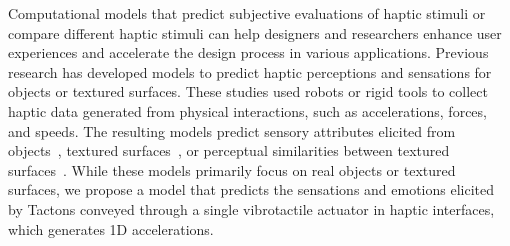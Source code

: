 Computational models that predict subjective evaluations of haptic stimuli or compare different haptic stimuli can help designers and researchers enhance user experiences and accelerate the design process in various applications. 
Previous research has developed models to predict haptic perceptions and sensations for objects or textured surfaces.
These studies used robots or rigid tools to collect haptic data generated from physical interactions, such as accelerations, forces, and speeds.
The resulting models predict sensory attributes elicited from objects~\cite{chu2015robotic, richardson2020learning, gao2016deep}, textured surfaces~\cite{awan2023predicting, ito2021model}, or perceptual similarities between textured surfaces~\cite{richardson2022learning}.
While these models primarily focus on real objects or textured surfaces, we propose a model that predicts the sensations and emotions elicited by Tactons conveyed through a single vibrotactile actuator in haptic interfaces, which generates 1D accelerations.


